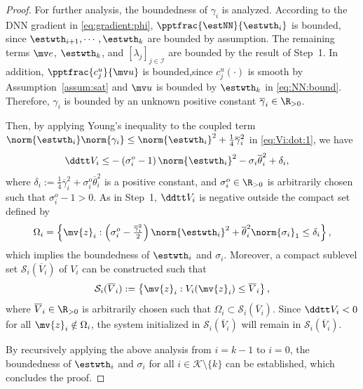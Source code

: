 \documentclass[letterpaper, journal]{IEEEtran}
\begin{document}
\begin{proof}
For further analysis, the boundedness of $\gamma_i$ is analyzed.
According to the DNN gradient in \eqref{eq:gradient:phi}, $\pptfrac{\estNN}{\estwth_i}$ is bounded, since $\estwth_{i+1},\cdots,\estwth_k$ are bounded by assumption.
The remaining terms $\mv e$, $\estwth_k$, and $[\lambda_j]_{j\in\mathcal I}$ are bounded by the result of Step~1.
In addition, $\pptfrac{c_j^u}{\mv u}$ is bounded,since $c_j^u(\cdot)$ is smooth by Assumption~\ref{assum:sat} and $\mv u$ is bounded by $\estwth_k$ in \eqref{eq:NN:bound}.
Therefore, $\gamma_i$ is bounded by an unknown positive constant $\overline{\gamma}_i\in\R_{>0}$.

Then, by applying Young's inequality to the coupled term $\norm{\estwth_i}\norm{\gamma_i}\le\norm{\estwth_i}^2+\tfrac{1}{4}\overline{\gamma}_i^2$ in \eqref{eq:Vi:dot:1}, we have
\begin{align} \label{eq:Vi:dot:2}
  \ddtt V_i
  \le&
    -
    \left(
      \sigma_i^o
      -
      1
    \right)
    \norm{\estwth_i}^2
    -
    \sigma_i \overline{\theta}_i^2
    +
    \delta_i
  ,
\end{align}
where $\delta_i:=\frac{1}{4}\overline{\gamma}_i^2 + \sigma_i^o \overline{\theta}_i^2$ is a positive constant, and $\sigma_i^o\in\R_{>0}$ is arbitrarily chosen such that $\sigma_i^o - 1 > 0$.
As in Step~1, $\ddtt V_i$ is negative outside the compact set defined by 
\begin{equation}
  \Omega_i
  =
  \left\{
    \mv{z}_i
    :
    \left(
      \sigma_i^o
      -
      \tfrac{\overline{\gamma}_i^2}{2}
    \right)
    \norm{\estwth_i}^2
    +
    \overline{\theta}_i^2
    \norm{\sigma_i}_1
    \le
    \delta_i
  \right\}
  , 
\end{equation}
which implies the boundedness of $\estwth_i$ and $\sigma_i$.
Moreover, a compact sublevel set $\mathcal{S}_i(\overline{V}_i)$ of $V_i$ can be constructed such that 
\begin{equation} \label{eq:Si:def}
  \mathcal{S}_i(\overline{V}_i)
  :=
  \left\{
    \mv{z}_i
    :
    V_i(\mv{z}_i)
    \le
    \overline{V}_i
  \right\}
  ,
\end{equation}
where $\overline{V}_i\in\R_{>0}$ is arbitrarily chosen such that $\Omega_i \subset \mathcal{S}_i(\overline{V}_i)$.
Since $\ddtt V_i<0$ for all $\mv{z}_i\notin\Omega_i$, the system initialized in $\mathcal{S}_i(\overline{V}_i)$ will remain in $\mathcal{S}_i(\overline{V}_i)$.

By recursively applying the above analysis from $i=k-1$ to $i=0$, the boundedness of $\estwth_i$ and $\sigma_i$ for all $i\in\mathcal{K}\setminus\{k\}$ can be established, which concludes the proof.

\end{proof}
\end{document}
